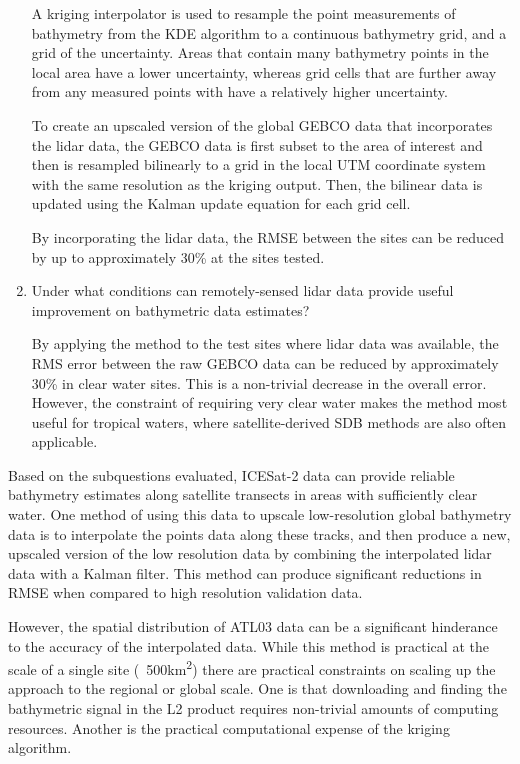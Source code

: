 \begin{enumerate}
    A kriging interpolator is used to resample the point measurements of bathymetry from the KDE algorithm to a continuous bathymetry grid, and a grid of the uncertainty. Areas that contain many bathymetry points in the local area have a lower uncertainty, whereas grid cells that are further away from any measured points with have a relatively higher uncertainty.

    To create an upscaled version of the global GEBCO data that incorporates the lidar data, the GEBCO data is first subset to the area of interest and then is resampled bilinearly to a grid in the local UTM coordinate system with the same resolution as the kriging output. Then, the bilinear data is updated using the Kalman update equation for each grid cell. 

    By incorporating the lidar data, the RMSE between the sites can be reduced by up to approximately 30\% at the sites tested.
    
    \item Under what conditions can remotely-sensed lidar data provide useful improvement on bathymetric data estimates?
    
    By applying the method to the test sites where lidar data was available, the RMS error between the raw GEBCO data can be reduced by approximately 30\% in clear water sites. This is a non-trivial decrease in the overall error. However, the constraint of requiring very clear water makes the method most useful for tropical waters, where satellite-derived SDB methods are also often applicable. 


\end{enumerate}

Based on the subquestions evaluated, ICESat-2 data can provide reliable bathymetry estimates along satellite transects in areas with sufficiently clear water. One method of using this data to upscale low-resolution global bathymetry data is to interpolate the points data along these tracks, and then produce a new, upscaled version of the low resolution data by combining the interpolated lidar data with a Kalman filter. This method can produce significant reductions in RMSE when compared to high resolution validation data. 

However, the spatial distribution of ATL03 data can be a significant hinderance to the accuracy of the interpolated data. While this method is practical at the scale of a single site (~500\si{km^2}) there are practical constraints on scaling up the approach to the regional or global scale. One is that downloading and finding the bathymetric signal in the L2 product requires non-trivial amounts of computing resources. Another is the practical computational expense of the kriging algorithm.



